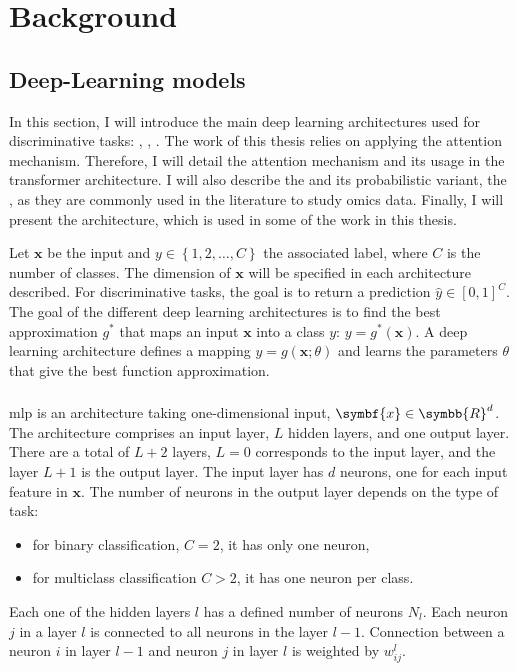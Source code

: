 \documentclass[../main.tex]{subfiles}
\begin{document}
\chapter{Background}\label{chap:background}
\minitocpagecentered

\section{Deep-Learning models}
	In this section, I will introduce the main deep learning architectures used for discriminative tasks: , , .
	The work of this thesis relies on applying the attention mechanism.
	Therefore, I will detail the attention mechanism and its usage in the transformer architecture.
	I will also describe the  and its probabilistic variant, the , as they are commonly used in the literature to study omics data.
	Finally, I will present the  architecture, which is used in some of the work in this thesis.

	Let \(\symbf{x}\) be the input and \(y \in \left\{1,2, \ldots, C \right\} \) the associated label, where \(C\) is the number of classes.
	The dimension of \(\symbf{x}\) will be specified in each architecture described.
	For discriminative tasks, the goal is to return a prediction \(\hat{y} \in {\left[0,1\right]}^C\).
	The goal of the different deep learning architectures is to find the best approximation \(g^{*}\) that maps an input \(\symbf{x}\) into a class \(y\): \(y = g^{*}\left(\symbf{x}\right)\).
	A deep learning architecture defines a mapping \(y=g\left(\symbf{x}; \theta\right)\) and learns the parameters \(\theta\) that give the best function approximation.


	\subsection{}\label{subsec:mlp}
		\Gls{mlp} is an architecture taking one-dimensional input, \(\symbf{x} \in \symbb{R}^d\).
		The architecture comprises an input layer, \(L\) hidden layers, and one output layer.
		There are a total of \(L+2\) layers, \(L=0\) corresponds to the input layer, and the layer \(L+1\) is the output layer.
		The input layer has \(d\) neurons, one for each input feature in \(\symbf{x}\).
		The number of neurons in the output layer depends on the type of task:
		\begin{itemize}
			\item for binary classification, \(C=2\), it has only one neuron,
			\item for multiclass classification \(C > 2 \), it has one neuron per class.
		\end{itemize}
		Each one of the hidden layers \(l\) has a defined number of neurons \(N_{l}\).
		Each neuron \(j\) in a layer \(l\) is connected to all neurons in the layer \(l-1\).
		Connection between a neuron \(i\) in layer \(l-1\) and neuron \(j\) in layer \(l\) is weighted by \(w^{l}_{ij}\).
\end{document}
